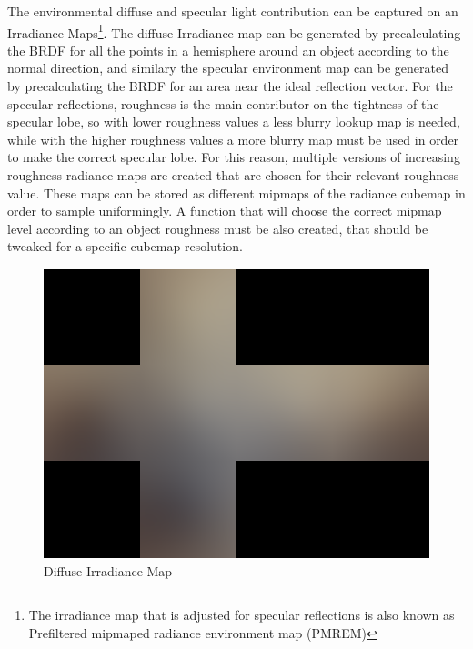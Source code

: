 The environmental diffuse and specular light contribution can be captured on an Irradiance Maps\footnote{The irradiance map that is
adjusted for specular reflections is also known as Prefiltered mipmaped radiance environment map (PMREM)}. The diffuse Irradiance map
can be generated by precalculating the BRDF for all the points in a hemisphere around an object according to the normal
direction, and similary the specular environment map can be generated by precalculating the BRDF for an area near the ideal reflection
vector. For the specular reflections, roughness is the main contributor on the tightness of the specular lobe, so with lower roughness
values a less blurry lookup map is needed, while with the higher roughness values a more blurry map must be used in order to make
the correct specular lobe. For this reason, multiple versions of increasing roughness radiance maps are created that are chosen
for their relevant roughness value. These maps can be stored as different mipmaps of the radiance cubemap in order to sample uniformingly.
A function that will choose the correct mipmap level according to an object roughness must be also created, that should be tweaked
for a specific cubemap resolution.

\begin{figure}[ht]
    \centering
    \includegraphics[scale=0.18,clip=true]{./image/envl_irr.png}
    \caption{Diffuse Irradiance Map}
\label{fig:envlirr}
\end{figure}

